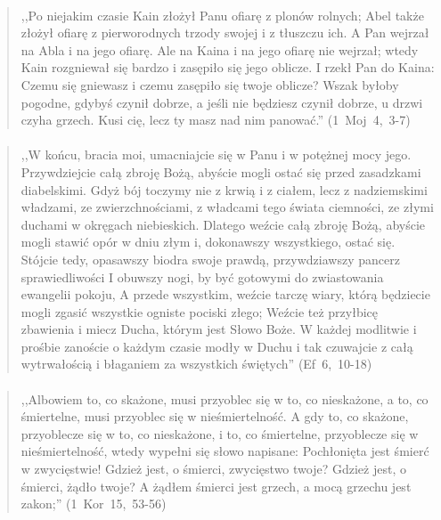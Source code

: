 \documentclass[10pt,a4paper,oneside]{article}
\begin{document}
\paragraph{}
\begin{quote}
,,Po niejakim czasie Kain złożył Panu ofiarę z plonów rolnych; Abel także złożył ofiarę z pierworodnych trzody swojej i z tłuszczu ich. A Pan wejrzał na Abla i na jego ofiarę. Ale na Kaina i na jego ofiarę nie wejrzał; wtedy Kain rozgniewał się bardzo i zasępiło się jego oblicze. I rzekł Pan do Kaina: Czemu się gniewasz i czemu zasępiło się twoje oblicze? Wszak byłoby pogodne, gdybyś czynił dobrze, a jeśli nie będziesz czynił dobrze, u drzwi czyha grzech. Kusi cię, lecz ty masz nad nim panować.'' \mbox{(1 Moj 4, 3-7)}
\end{quote}
\paragraph{}
\begin{quote}
,,W końcu, bracia moi, umacniajcie się w Panu i w potężnej mocy jego. Przywdziejcie całą zbroję Bożą, abyście mogli ostać się przed zasadzkami diabelskimi. Gdyż bój toczymy nie z krwią i z ciałem, lecz z nadziemskimi władzami, ze zwierzchnościami, z władcami tego świata ciemności, ze złymi duchami w okręgach niebieskich. Dlatego weźcie całą zbroję Bożą, abyście mogli stawić opór w dniu złym i, dokonawszy wszystkiego, ostać się. Stójcie tedy, opasawszy biodra swoje prawdą, przywdziawszy pancerz sprawiedliwości I obuwszy nogi, by być gotowymi do zwiastowania ewangelii pokoju, A przede wszystkim, weźcie tarczę wiary, którą będziecie mogli zgasić wszystkie ogniste pociski złego; Weźcie też przyłbicę zbawienia i miecz Ducha, którym jest Słowo Boże. W każdej modlitwie i prośbie zanoście o każdym czasie modły w Duchu i tak czuwajcie z całą wytrwałością i błaganiem za wszystkich świętych'' \mbox{(Ef 6, 10-18)}
\end{quote}
\paragraph{}
\begin{quote}
,,Albowiem to, co skażone, musi przyoblec się w to, co nieskażone, a to, co śmiertelne, musi przyoblec się w nieśmiertelność. A gdy to, co skażone, przyoblecze się w to, co nieskażone, i to, co śmiertelne, przyoblecze się w nieśmiertelność, wtedy wypełni się słowo napisane: Pochłonięta jest śmierć w zwycięstwie! Gdzież jest, o śmierci, zwycięstwo twoje? Gdzież jest, o śmierci, żądło twoje? A żądłem śmierci jest grzech, a mocą grzechu jest zakon;'' \mbox{(1 Kor 15, 53-56)}
\end{quote}
\end{document}
